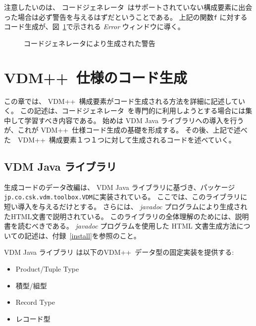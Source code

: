 \documentclass[\pformat,11pt]{jarticle}
\newcommand{\tcg}{コードジェネレータ}
\newcommand{\Tcg}{コードジェネレータ}
\newcommand{\VDM}{VDM++}
\newcommand{\JL}{VDM Java ライブラリ}
\begin{document}
注意したいのは、 \Tcg\ はサポートされていない構成要素に出会った場合は必ず警告を与えるはずだということである。
上記の関数{\tt f} に対するコード生成が、図~\ref{fig:cg_error}で示される {\em Error} ウィンドウに導く。

\begin{figure}[H]
\begin{center}
\mbox{}
\caption{コードジェネレータにより生成された警告}\label{fig:cg_error}
\end{center}
\end{figure}

\newpage
\section{\VDM\ 仕様のコード生成}
\label{sec:relation}

この章では、 \VDM\ 構成要素がコード生成される方法を詳細に記述していく。
この記述は、\tcg\ を専門的に利用しようとする場合には集中して学習すべき内容である。
始めは \JL{}への導入を行うが、これが \VDM\ 仕様コード生成の基礎を形成する。
その後、上記で述べた　\VDM\ 構成要素１つ１つに対して生成されるコードを述べていく。

\subsection{VDM Java ライブラリ}
\label{VDMlib}

生成コードのデータ改編は、 \JL{}に基づき、パッケージ {\tt jp.co.csk.vdm.toolbox.VDM}に実装されている。
ここでは、このライブラリに短い導入を与えるだけとする。
さらには、 {\em javadoc} プログラムにより生成されたHTML文書で説明されている。
このライブラリの全体理解のためには、説明書を読むべきである。
 {\em javadoc} プログラムを使用した HTML 文書生成方法についての記述は、付録~\ref{install}を参照のこと。

 \JL{} は以下の\VDM\ データ型の固定実装を提供する:

\begin{itemize}
\item Product/Tuple Type
\item 積型/組型
\item Record Type
\item レコード型
\end{itemize}
\end{document}
